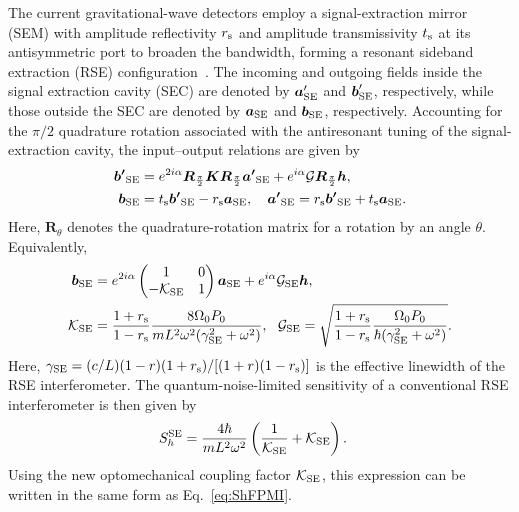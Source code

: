 \documentclass{iopjournal}
\begin{document}
The current gravitational-wave detectors employ a signal-extraction mirror (SEM) with amplitude
reflectivity \(r_{\rm s}\) and amplitude transmissivity \(t_{\rm s}\)
at its antisymmetric port to broaden the bandwidth, forming a resonant sideband extraction (RSE) configuration~\cite{Mizuno1993RSE}. The incoming and outgoing fields inside the signal extraction cavity (SEC) are denoted by \(\boldsymbol{a}'_{\rm SE}\) and
\(\boldsymbol{b}'_{\rm SE}\), respectively, while those outside the SEC are denoted by \(\boldsymbol{a}_{\rm SE}\) and
\(\boldsymbol{b}_{\rm SE}\), respectively. Accounting for the \(\pi/2\) quadrature rotation
associated with the antiresonant tuning of the signal-extraction
cavity, the input--output relations are given by
\begin{align}            \boldsymbol{{b'}}_\mathrm{SE}&=e^{2i\alpha}\boldsymbol{R}_\frac{\pi}{2}\boldsymbol{K}\boldsymbol{R}_\frac{\pi}{2}\boldsymbol{{a'}}_\mathrm{SE}+e^{i\alpha}{\cal G}\boldsymbol{R}_\frac{\pi}{2}\boldsymbol{h},\label{eq:IO-SEC}\\
\boldsymbol{{b}}_\mathrm{SE}&=t_{\rm s}\boldsymbol{{b'}}_\mathrm{SE}-r_{\rm s}\boldsymbol{{a}}_\mathrm{SE},\ \ \ 
\boldsymbol{{a'}}_\mathrm{SE}=r_{\rm s}\boldsymbol{{b'}}_\mathrm{SE}+t_{\rm s}\boldsymbol{{a}}_\mathrm{SE}.\label{eq:IO-SEM}
\end{align}
Here, \(\boldsymbol{R}_{\theta}\) denotes the quadrature-rotation matrix
for a rotation by an angle \(\theta\).
Equivalently,
\begin{align}
    \boldsymbol{{b}}_\mathrm{SE}&=e^{2i\alpha}\begin{pmatrix}
        1 & 0\\
        -{\cal K_{\rm SE}} & 1
    \end{pmatrix}\boldsymbol{{a}}_\mathrm{SE}+e^{i\alpha}{\cal G}_{\rm SE}\boldsymbol{h},\label{eq:IO-RSE}\\
    \cal K_\mathrm{SE}&=\frac{1+r_{\rm s}}{1- r_{\rm s}}\frac{8\Omega_0P_{0}}{mL^2\omega^2(\gamma_{\rm SE}^2+\omega^2)},\label{eq:K_se}\ \ 
    \mathcal{G}_{\rm SE}=\sqrt{\frac{1+r_{\rm s}}{1- r_{\rm s}}  \frac{\Omega_0P_0}{\hbar(\gamma_{\rm SE}^2+\omega^2)}}.
\end{align}
Here,
\(\gamma_{\rm SE}=(c/L)(1-r)(1+r_{\rm s})/
[(1+r)(1-r_{\rm s})]\)
is the effective linewidth of the RSE interferometer. The
quantum-noise-limited sensitivity of a conventional RSE interferometer
is then given by
\begin{align}
    S^\mathrm{SE}_h&=\frac{4\hbar}{mL^2\omega^2}\left(\frac{1}{\cal K_\mathrm{SE}}+\cal K_\mathrm{SE}\right)\label{eq:S-SE}.
\end{align}
Using the new optomechanical coupling factor $\cal K_\mathrm{SE}$, this expression can be
written in the same form as Eq.~\eqref{eq:ShFPMI}.
\end{document}

